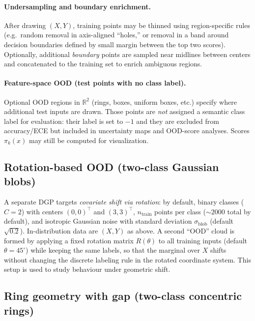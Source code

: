 \paragraph{Undersampling and boundary enrichment.}
After drawing $(X,Y)$, training points may be thinned using region-specific rules (e.g.\ random removal in axis-aligned ``holes,'' or removal in a band around decision boundaries defined by small margin between the top two scores). Optionally, additional \emph{boundary} points are sampled near midlines between centers and concatenated to the training set to enrich ambiguous regions.

\paragraph{Feature-space OOD (test points with no class label).}
Optional OOD regions in $\mathbb{R}^2$ (rings, boxes, uniform boxes, etc.) specify where additional test inputs are drawn. Those points are \emph{not} assigned a semantic class label for evaluation: their label is set to $-1$ and they are excluded from accuracy/ECE but included in uncertainty maps and OOD-score analyses. Scores $\pi_k(x)$ may still be computed for visualization.

\subsection{Rotation-based OOD (two-class Gaussian blobs)}
\label{sec:clf-rotation-ood}

A separate DGP targets \emph{covariate shift via rotation}: by default, binary classes ($C=2$) with centers $(0,0)^\top$ and $(3,3)^\top$, $n_{\mathrm{train}}$ points per class ($\sim 2000$ total by default), and isotropic Gaussian noise with standard deviation $\sigma_{\mathrm{blob}}$ (default $\sqrt{0.2}$). In-distribution data are $(X,Y)$ as above. A second ``OOD'' cloud is formed by applying a fixed rotation matrix $R(\theta)$ to all training inputs (default $\theta=45^\circ$) while keeping the same labels, so that the marginal over $X$ shifts without changing the discrete labeling rule in the rotated coordinate system. This setup is used to study behaviour under geometric shift.

\subsection{Ring geometry with gap (two-class concentric rings)}
\label{sec:clf-ring-ood}

